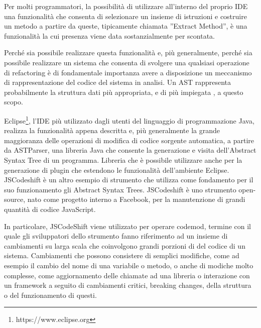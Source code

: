 Per molti programmatori, la possibilità di utilizzare all’interno del proprio
IDE una funzionalità che consenta di selezionare un insieme di istruzioni e
costruire un metodo a partire da queste, tipicamente chiamata ”Extract Method”,
è una funzionalità la cui presenza viene data sostanzialmente per scontata.

Perché sia possibile realizzare questa funzionalità e, più generalmente, perché
sia possibile realizzare un sistema che consenta di svolgere una qualsiasi
operazione di refactoring è di fondamentale importanza avere a disposizione un
meccanismo di rappresentazione del codice del sistema in analisi. Un AST
rappresenta probabilmente la struttura dati più appropriata, e di più impiegata
\cite{eclipse2006} \cite{netbeans2007}, a questo scopo.

Eclipse\footnote{https://www.eclipse.org}, l’IDE più utilizzato dagli utenti
del linguaggio di programmazione Java, realizza la funzionalità appena
descritta e, più generalmente la grande maggioranza delle operazioni di
modifica di codice sorgente automatica, a partire da ASTParser, una libreria
Java che consente la generazione e visita dell’Abstract Syntax Tree di un
programma. Libreria che è possibile utilizzare anche per la generazione di
plugin che estendono le funzionalità dell’ambiente Eclipse.\\

JSCodeshift \cite{jscodeshift2016} è un altro esempio di strumento che utilizza
come fondamento per il suo funzionamento gli Abstract Syntax Trees. JSCodeshift
è uno strumento open-source, nato come progetto interno a Facebook\texttrademark,
per la manutenzione di grandi quantità di codice JavaScript.

In particolare, JSCodeShift viene utilizzato per operare codemod, termine con
il quale gli sviluppatori dello strumento fanno riferimento ad un insieme di
cambiamenti su larga scala che coinvolgono grandi porzioni di del codice di un
sistema. Cambiamenti che possono consistere di semplici modifiche, come ad
esempio il cambio del nome di una variabile o metodo, o anche di modiche molto
complesse, come aggiornamento delle chiamate ad una libreria o interazione con
un framework a seguito di cambiamenti critici, breaking changes, della
struttura o del funzionamento di questi.\\

